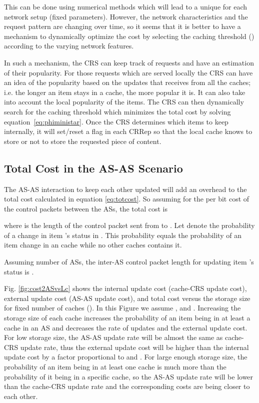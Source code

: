 \documentclass[conference]{IEEEtran}
\theoremstyle{plain}
\theoremstyle{remark}
\begin{document}
This can be done using numerical methods which will lead to a unique  for each network setup (fixed parameters). However, the network characteristics and the request pattern are changing over time, so it seems that it is better to have a mechanism to dynamically optimize the cost by selecting the caching threshold () according to the varying network features.





In such a mechanism, the CRS can keep track of requests and have an estimation of their popularity. For those requests which are served locally the CRS can have an idea of the popularity based on the updates that receives from all the caches; i.e. the longer an item stays in a cache, the more popular it is. It can also take into account the local popularity of the items. The CRS can then dynamically search for the caching threshold which minimizes the total cost by solving equation~\ref{eq:phiministar}. Once the CRS determines which items to keep internally, it will set/reset a flag in each CRRep so that the local cache knows to store or not to store the requested piece of content.




\subsection{Total Cost in the AS-AS Scenario }

The AS-AS interaction to keep each other updated will add an overhead to the total cost calculated in equation \ref{eq:totcost}. So assuming  for the per bit cost of the control packets between the ASs, the total cost is

where  is the length of the control packet sent from  to . Let  denote the probability of a change in item 's status in . This probability equals the probability of an item  change in an  cache while no other caches contains it.

Assuming  number of ASs, the inter-AS control packet length for updating item 's status is .

Fig. \ref{fig:cost2ASvsLc} shows the internal update cost (cache-CRS update cost), external update cost (AS-AS update cost), and total cost versus the storage size for fixed number of caches (). In this Figure we assume , and . Increasing the storage size of each cache increases the probability of an item being in at least a cache in an AS and decreases the rate of updates and the external update cost. For low storage size, the AS-AS update rate will be almost the same as cache-CRS update rate, thus the external update cost will be higher than the internal update cost by a factor proportional to  and . For large enough storage size, the probability of an item being in at least one cache is much more than the probability of it being in a specific cache, so the AS-AS update rate will be lower than the cache-CRS update rate and the corresponding costs are being closer to each other.
\end{document}
